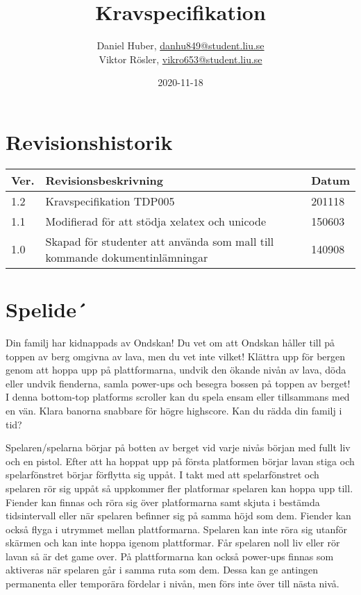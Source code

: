 \documentclass{TDP005mall}
\author{Daniel Huber, \url{danhu849@student.liu.se}\\
  Viktor Rösler, \url{vikro653@student.liu.se}}
\title{Kravspecifikation}
\date{2020-11-18}
\begin{document}
\projectpage
\tableofcontents
\section{Revisionshistorik}
\begin{table}[!h]
\begin{tabularx}{\linewidth}{|l|X|l|}
\hline
Ver. & Revisionsbeskrivning & Datum \\\hline
1.2 & Kravspecifikation TDP005 & 201118 \\\hline
1.1 & Modifierad för att stödja xelatex och unicode & 150603 \\\hline
1.0 & Skapad för studenter att använda som mall till
kommande dokumentinlämningar & 140908 \\\hline
\end{tabularx}
\end{table}


\section{Spelide´}%
Din familj har kidnappads av Ondskan! Du vet om att Ondskan håller till på toppen av berg omgivna av lava, men du vet inte vilket! Klättra upp för bergen genom att hoppa upp på plattformarna, undvik den ökande nivån av lava, döda eller undvik fienderna, samla power-ups och besegra bossen på toppen av berget! I denna bottom-top platforms scroller kan du spela ensam eller tillsammans med en vän. Klara banorna snabbare för högre highscore. Kan du rädda din familj i tid?

Spelaren/spelarna börjar på botten av berget vid varje nivås början med fullt liv och en pistol. Efter att ha hoppat upp på första platformen börjar lavan stiga och spelarfönstret börjar förflytta sig uppåt. I takt med att spelarfönstret och spelaren rör sig uppåt så uppkommer fler platformar spelaren kan hoppa upp till. Fiender kan finnas och röra sig över platformarna samt skjuta i bestämda tidsintervall eller när spelaren befinner sig på samma höjd som dem. Fiender kan också flyga i utrymmet mellan plattformarna. Spelaren kan inte röra sig utanför skärmen och kan inte hoppa igenom plattformar. Får spelaren noll liv eller rör lavan så är det game over. På plattformarna kan också power-ups finnas som aktiveras när spelaren går i samma ruta som dem. Dessa kan ge antingen permanenta eller temporära fördelar i nivån, men förs inte över till nästa nivå.
\end{document}
